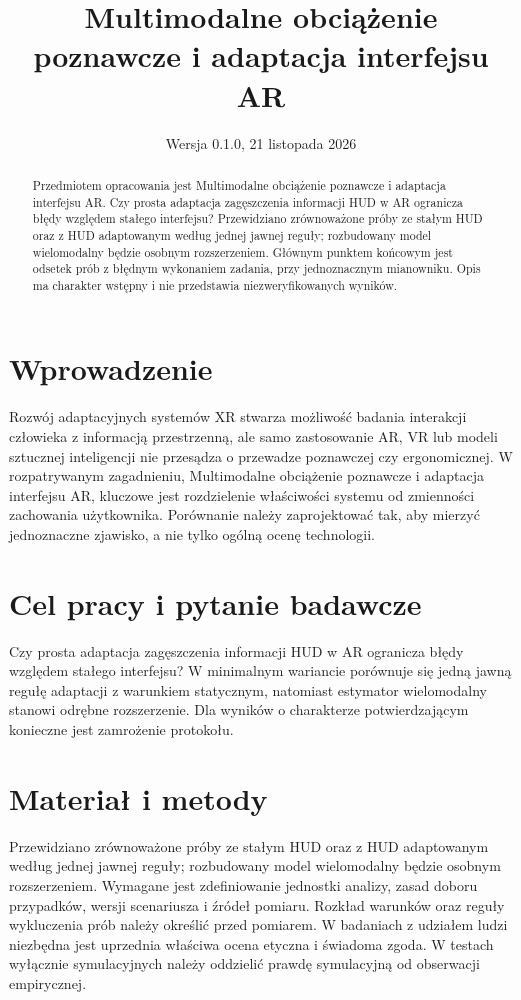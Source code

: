 \documentclass[11pt,a4paper]{article}
\title{Multimodalne obciążenie poznawcze i adaptacja interfejsu AR}
\author{}
\date{Wersja 0.1.0, 21 listopada 2026}
\begin{document}
\maketitle

\begin{abstract}

Przedmiotem opracowania jest Multimodalne obciążenie poznawcze i adaptacja interfejsu AR. Czy prosta adaptacja zagęszczenia informacji HUD w AR ogranicza błędy względem stałego interfejsu? Przewidziano zrównoważone próby ze stałym HUD oraz z HUD adaptowanym według jednej jawnej reguły; rozbudowany model wielomodalny będzie osobnym rozszerzeniem. Głównym punktem końcowym jest odsetek prób z błędnym wykonaniem zadania, przy jednoznacznym mianowniku. Opis ma charakter wstępny i nie przedstawia niezweryfikowanych wyników.

\end{abstract}

\section{Wprowadzenie}

Rozwój adaptacyjnych systemów XR stwarza możliwość badania interakcji człowieka z informacją przestrzenną, ale samo zastosowanie AR, VR lub modeli sztucznej inteligencji nie przesądza o przewadze poznawczej czy ergonomicznej. W rozpatrywanym zagadnieniu, Multimodalne obciążenie poznawcze i adaptacja interfejsu AR, kluczowe jest rozdzielenie właściwości systemu od zmienności zachowania użytkownika. Porównanie należy zaprojektować tak, aby mierzyć jednoznaczne zjawisko, a nie tylko ogólną ocenę technologii.

\section{Cel pracy i pytanie badawcze}

Czy prosta adaptacja zagęszczenia informacji HUD w AR ogranicza błędy względem stałego interfejsu? W minimalnym wariancie porównuje się jedną jawną regułę adaptacji z warunkiem statycznym, natomiast estymator wielomodalny stanowi odrębne rozszerzenie. Dla wyników o charakterze potwierdzającym konieczne jest zamrożenie protokołu.

\section{Materiał i metody}

Przewidziano zrównoważone próby ze stałym HUD oraz z HUD adaptowanym według jednej jawnej reguły; rozbudowany model wielomodalny będzie osobnym rozszerzeniem. Wymagane jest zdefiniowanie jednostki analizy, zasad doboru przypadków, wersji scenariusza i źródeł pomiaru. Rozkład warunków oraz reguły wykluczenia prób należy określić przed pomiarem. W badaniach z udziałem ludzi niezbędna jest uprzednia właściwa ocena etyczna i świadoma zgoda. W testach wyłącznie symulacyjnych należy oddzielić prawdę symulacyjną od obserwacji empirycznej.
\end{document}
